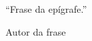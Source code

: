 \begin{epigrafe}
	\vspace*{\fill}
    \hspace{.45\textwidth}
    \begin{minipage}{.5\textwidth}
        \begin{flushright}
            ``Frase da epígrafe.''\par
        	Autor da frase
        \end{flushright}
    \end{minipage}
\end{epigrafe}